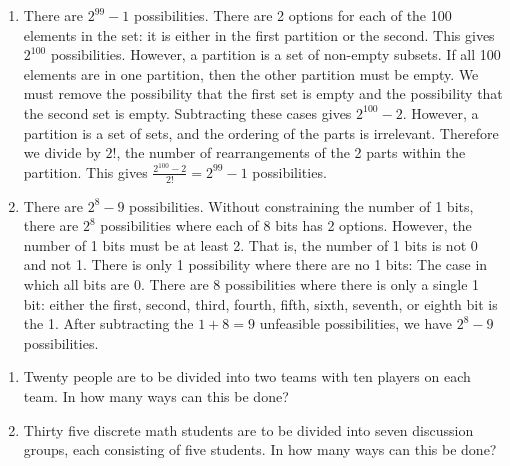 \documentclass{article}
\theoremstyle{definition}
\begin{document}
\begin{solution}
\begin{enumerate}
\item  There are $2^{99}-1$ possibilities. There are 2 options for each of the 100 elements in the set: it is either in the first partition or the second. This gives $2^{100}$ possibilities. However, a partition is a set of non-empty subsets. If all 100 elements are in one partition, then the other partition must be empty. We must remove the possibility that the first set is empty and the possibility that the second set is empty. Subtracting these cases gives $2^{100}-2$. However, a partition is a set of sets, and the ordering of the parts is irrelevant. Therefore we divide by $2!$, the number of rearrangements of the 2 parts within the partition. This gives $\frac{2^{100}-2}{2!}=2^{99}-1$ possibilities.
\item There are $2^8-9$ possibilities. Without constraining the number of 1 bits, there are $2^8$ possibilities where each of 8 bits has 2 options. However, the number of 1 bits must be at least 2. That is, the number of 1 bits is not 0 and not 1. There is only 1 possibility where there are no 1 bits: The case in which all bits are 0. There are 8 possibilities where there is only a single 1 bit: either the first, second, third, fourth, fifth, sixth, seventh, or eighth bit is the 1. After subtracting the $1+8=9$ unfeasible possibilities, we have $2^8-9$ possibilities.
\end{enumerate}
\end{solution}
\begin{question}
    \begin{enumerate}
	\item Twenty people are to be divided into two teams with ten players on each team.  
	In how many ways can this be done?
        \item Thirty five discrete math students are to be divided into seven discussion groups, each consisting of five students.  
        In how many ways can this be done?
   	\end{enumerate}
\end{question}
\end{document}
